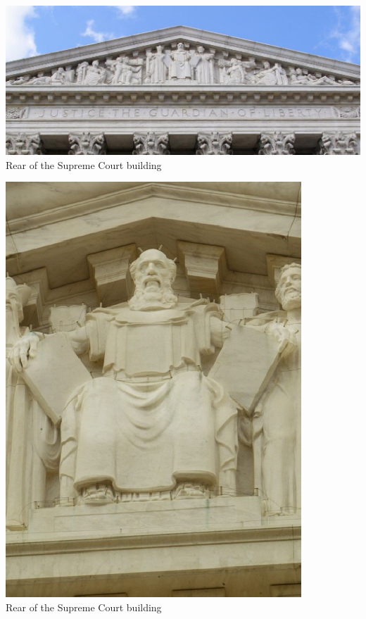 \begin{frame}
    \centering
    \includegraphics[width=.98\textwidth]{img/supcourt-east-clipped.png} \\
    \large{ Rear of the Supreme Court building } \\
\end{frame}
\begin{frame}
    \centering
    \includegraphics[height=.9\textheight]{img/moses_east_supcourt.jpg} \\
    \large{ Rear of the Supreme Court building } \\
\end{frame}

